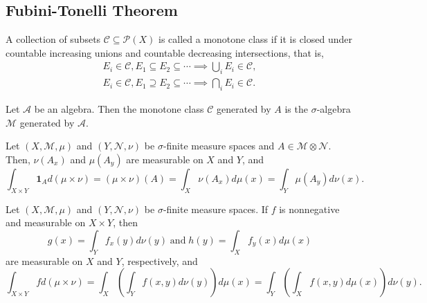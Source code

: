 \documentclass[class=book, crop=false]{standalone}
\begin{document}
        \subsection{Fubini-Tonelli Theorem}
        \begin{definition}
            A collection of subsets $\mathscr{C} \subseteq \mathscr{P}(X)$ is called a monotone class if it is closed under countable increasing unions and countable decreasing intersections, that is,
            \begin{align*}
                E_i \in \mathscr{C}, E_1 \subseteq E_2 \subseteq \cdots \implies \bigcup_i E_i \in \mathscr{C}, \\
                E_i \in \mathscr{C}, E_1 \supseteq E_2 \subseteq \cdots \implies \bigcap_i E_i \in \mathscr{C}.
            \end{align*}
        \end{definition}

        \begin{theorem}
            Let $\mathscr{A}$ be an algebra. Then the monotone class $\mathscr{C}$ generated by $A$ is the $\sigma$-algebra $\mathscr{M}$ generated by $\mathscr{A}$.
        \end{theorem}

        \begin{theorem}
            Let $(X, \mathscr{M}, \mu)$ and $(Y, \mathscr{N}, \nu)$ be $\sigma$-finite measure spaces and $A \in \mathscr{M} \otimes \mathscr{N}$. Then, $\nu(A_x)$ and $\mu(A_y)$ are measurable on $X$ and $Y$, and
            \begin{equation*}
                \int_{X \times Y} \mathbf{1}_A d(\mu \times \nu) = (\mu \times \nu)(A) = \int_X \nu(A_x) d\mu(x) = \int_Y \mu(A_y) d\nu(x).
            \end{equation*}
        \end{theorem}

        \begin{theorem}
            Let $(X, \mathscr{M}, \mu)$ and $(Y, \mathscr{N}, \nu)$ be $\sigma$-finite measure spaces. If $f$ is nonnegative and measurable on $X \times Y$, then
            \begin{equation*}
                g(x) = \int_Y f_x(y) d\nu(y) \;\text{and}\; h(y) = \int_X f_y(x) d\mu(x)
            \end{equation*}
            are measurable on $X$ and $Y$, respectively, and
            \begin{equation*}
                \int_{X \times Y} f d(\mu \times \nu) = \int_X \left(\int_Y f(x, y) d\nu(y)\right) d\mu(x) = \int_Y \left(\int_X f(x, y) d\mu(x)\right) d\nu(y).
            \end{equation*}
        \end{theorem}
\end{document}
